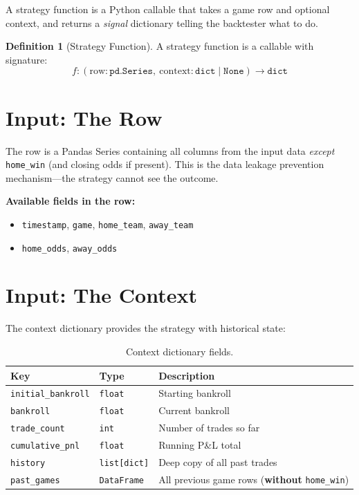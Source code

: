 \documentclass[12pt,a4paper]{report}
\theoremstyle{definition}
\newtheorem{definition}{Definition}[chapter]
\newcommand{\code}[1]{\texttt{#1}}
\begin{document}
A strategy function is a Python callable that takes a game row and optional context, and returns a \emph{signal} dictionary telling the backtester what to do.

\begin{definition}[Strategy Function]
A strategy function is a callable with signature:
\[
    f: (\text{row}: \texttt{pd.Series},\ \text{context}: \texttt{dict} \mid \texttt{None}) \to \texttt{dict}
\]
\end{definition}

\section{Input: The Row}

The row is a Pandas Series containing all columns from the input data \emph{except} \code{home\_win} (and closing odds if present). This is the data leakage prevention mechanism—the strategy cannot see the outcome.

\textbf{Available fields in the row:}
\begin{itemize}
    \item \code{timestamp}, \code{game}, \code{home\_team}, \code{away\_team}
    \item \code{home\_odds}, \code{away\_odds}
\end{itemize}

\section{Input: The Context}

The context dictionary provides the strategy with historical state:

\begin{table}[H]
\centering
\caption{Context dictionary fields.}
\label{tab:context}
\begin{tabularx}{\textwidth}{llX}
\toprule
\textbf{Key} & \textbf{Type} & \textbf{Description} \\
\midrule
\code{initial\_bankroll} & \code{float}       & Starting bankroll \\
\code{bankroll}          & \code{float}       & Current bankroll \\
\code{trade\_count}      & \code{int}         & Number of trades so far \\
\code{cumulative\_pnl}   & \code{float}       & Running P\&L total \\
\code{history}           & \code{list[dict]}  & Deep copy of all past trades \\
\code{past\_games}       & \code{DataFrame}   & All previous game rows (\textbf{without} \code{home\_win}) \\
\bottomrule
\end{tabularx}
\end{table}
\end{document}
